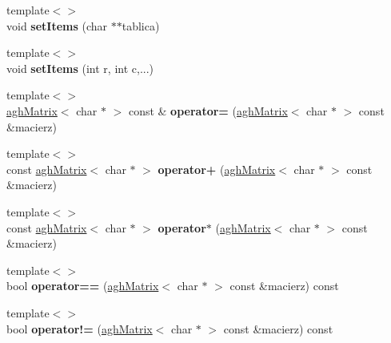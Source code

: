 \begin{DoxyCompactItemize}
\item 
\hypertarget{classaghMatrix_a812185393e933bfd00339ec652a85769}{{\footnotesize template$<$$>$ }\\void {\bfseries set\-Items} (char $\ast$$\ast$tablica)}\label{classaghMatrix_a812185393e933bfd00339ec652a85769}

\item 
\hypertarget{classaghMatrix_a71906a062e5a6115faa3c4e6d3a538d1}{{\footnotesize template$<$$>$ }\\void {\bfseries set\-Items} (int r, int c,...)}\label{classaghMatrix_a71906a062e5a6115faa3c4e6d3a538d1}

\item 
\hypertarget{classaghMatrix_ab663b12fd56cf4aa499cd67434f0e6ec}{{\footnotesize template$<$$>$ }\\\hyperlink{classaghMatrix}{agh\-Matrix}$<$ char $\ast$ $>$ const \& {\bfseries operator=} (\hyperlink{classaghMatrix}{agh\-Matrix}$<$ char $\ast$ $>$ const \&macierz)}\label{classaghMatrix_ab663b12fd56cf4aa499cd67434f0e6ec}

\item 
\hypertarget{classaghMatrix_a01da87c9cb582f63ef9a54b180df7e7d}{{\footnotesize template$<$$>$ }\\const \hyperlink{classaghMatrix}{agh\-Matrix}$<$ char $\ast$ $>$ {\bfseries operator+} (\hyperlink{classaghMatrix}{agh\-Matrix}$<$ char $\ast$ $>$ const \&macierz)}\label{classaghMatrix_a01da87c9cb582f63ef9a54b180df7e7d}

\item 
\hypertarget{classaghMatrix_a625cd50cf56264c33ef7f9161cccb5f9}{{\footnotesize template$<$$>$ }\\const \hyperlink{classaghMatrix}{agh\-Matrix}$<$ char $\ast$ $>$ {\bfseries operator$\ast$} (\hyperlink{classaghMatrix}{agh\-Matrix}$<$ char $\ast$ $>$ const \&macierz)}\label{classaghMatrix_a625cd50cf56264c33ef7f9161cccb5f9}

\item 
\hypertarget{classaghMatrix_a09574b9a3132442f8a837d0718e2e933}{{\footnotesize template$<$$>$ }\\bool {\bfseries operator==} (\hyperlink{classaghMatrix}{agh\-Matrix}$<$ char $\ast$ $>$ const \&macierz) const}\label{classaghMatrix_a09574b9a3132442f8a837d0718e2e933}

\item 
\hypertarget{classaghMatrix_a3ac665fcb300c8aca4ff0cc5aaedf4d3}{{\footnotesize template$<$$>$ }\\bool {\bfseries operator!=} (\hyperlink{classaghMatrix}{agh\-Matrix}$<$ char $\ast$ $>$ const \&macierz) const}\label{classaghMatrix_a3ac665fcb300c8aca4ff0cc5aaedf4d3}


\end{DoxyCompactItemize}
